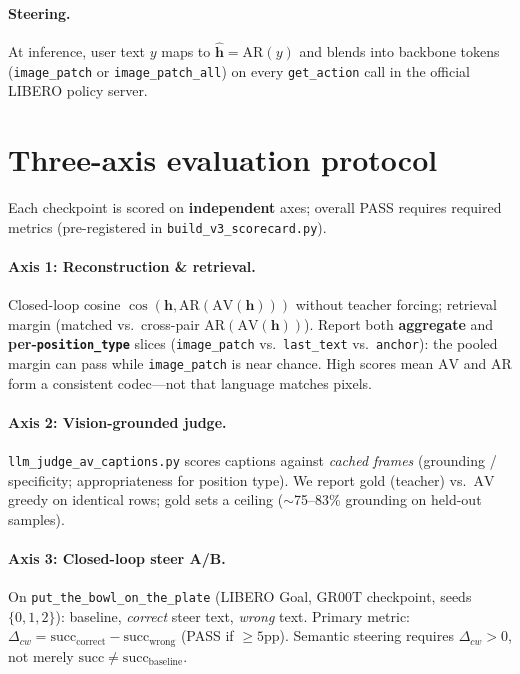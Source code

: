 \documentclass{article}
\newcommand{\AV}{\ensuremath{\mathrm{AV}}}
\newcommand{\AR}{\ensuremath{\mathrm{AR}}}
\newcommand{\hvec}{\mathbf{h}}
\newcommand{\hhat}{\hat{\mathbf{h}}}
\newcommand{\code}[1]{\texttt{\small #1}}
\begin{document}
\paragraph{Steering.}
At inference, user text \(y\) maps to \(\hhat=\AR(y)\) and blends into
backbone tokens (\code{image\_patch} or \code{image\_patch\_all}) on every
\code{get\_action} call in the official LIBERO policy server.

\section{Three-axis evaluation protocol}
\label{sec:protocol}

Each checkpoint is scored on \textbf{independent} axes; overall PASS requires
required metrics (pre-registered in \code{build\_v3\_scorecard.py}).

\paragraph{Axis 1: Reconstruction \& retrieval.}
Closed-loop cosine \(\cos(\hvec,\AR(\AV(\hvec)))\) without teacher forcing;
retrieval margin (matched vs.\ cross-pair \(\AR(\AV(\hvec))\)).
Report both \textbf{aggregate} and \textbf{per-\code{position\_type}} slices
(\code{image\_patch} vs.\ \code{last\_text} vs.\ \code{anchor}): the pooled
margin can pass while \code{image\_patch} is near chance.
High scores mean \(\AV\) and \(\AR\) form a consistent codec---not that
language matches pixels.

\paragraph{Axis 2: Vision-grounded judge.}
\code{llm\_judge\_av\_captions.py} scores captions against \emph{cached frames}
(grounding / specificity; appropriateness for position type).
We report gold (teacher) vs.\ \(\AV\) greedy on identical rows; gold sets a
ceiling ($\sim$75--83\% grounding on held-out samples).

\paragraph{Axis 3: Closed-loop steer A/B.}
On \code{put\_the\_bowl\_on\_the\_plate} (LIBERO Goal, GR00T checkpoint,
seeds \(\{0,1,2\}\)): baseline, \emph{correct} steer text, \emph{wrong} text.
Primary metric: \(\Delta_{cw} = \mathrm{succ}_{\text{correct}} -
\mathrm{succ}_{\text{wrong}}\) (PASS if $\geq 5$pp).
Semantic steering requires \(\Delta_{cw} > 0\), not merely
\(\mathrm{succ} \neq \mathrm{succ}_{\text{baseline}}\).
\end{document}
